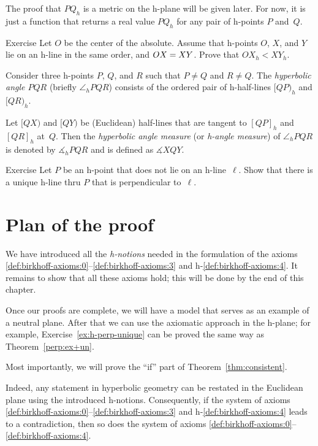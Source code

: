 The proof that $PQ_h$ is a metric on the h-plane will be given later.
For now, it is just a function that returns a real value $PQ_h$ for any pair of h-points $P$ and~$Q$.

\begin{thm}{Exercise}\label{ex:h-dist-eq}
Let $O$ be the center of the absolute.
Assume that h-points $O$, $X$, and $Y$ lie on an h-line in the same order, and $OX\z=XY$.
Prove that $OX_h<XY_h$.
\end{thm}


\label{h-angle measure}
Consider three h-points $P$, $Q$, and $R$
such that $P\ne Q$ and $R\ne Q$.
The \emph{hyperbolic angle $PQR$} (briefly $\angle_h PQR$) consists of the ordered pair of h-half-lines $[QP)_h$ and $[QR)_h$.

Let $[QX)$ and $[QY)$ be (Euclidean) half-lines 
that are tangent to $[QP]_h$ and $[QR]_h$ 
at~$Q$.
Then the \emph{hyperbolic angle measure} (or \emph{h-angle measure}) of $\angle_h PQR$ is denoted by
$\measuredangle_h PQR$ and is defined as
$\measuredangle XQY$.

\begin{thm}{Exercise}\label{ex:h-perp-unique}
Let $P$ be an h-point that does not lie on an h-line~$\ell$.
Show that there is a unique h-line thru $P$ that is perpendicular to~$\ell$.
\end{thm}

\section{Plan of the proof}

We have introduced all the {}\emph{h-notions} needed in the formulation of the axioms \ref{def:birkhoff-axioms:0}--\ref{def:birkhoff-axioms:3} and h-\ref{def:birkhoff-axioms:4}.
It remains to show that all these axioms hold; 
this will be done by the end of this chapter.

Once our proofs are complete, we will have a model that serves as an example of a neutral plane.
After that we can use the axiomatic approach in the h-plane;
for example, Exercise~\ref{ex:h-perp-unique} can be proved the same way as Theorem~\ref{perp:ex+un}.

Most importantly, we will prove the ``if'' part of Theorem~\ref{thm:consistent}.

Indeed, any statement in hyperbolic geometry can be restated in the Euclidean plane using the introduced h-notions.
Consequently, if the system of axioms \ref{def:birkhoff-axioms:0}--\ref{def:birkhoff-axioms:3} and h-\ref{def:birkhoff-axioms:4} leads to a contradiction, then so does the system of axioms \ref{def:birkhoff-axioms:0}--\ref{def:birkhoff-axioms:4}.

